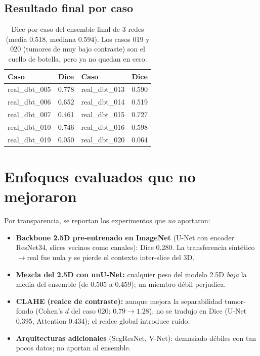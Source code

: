 \documentclass[11pt]{article}
\begin{document}
\subsection{Resultado final por caso}
\begin{table}[H]\centering
\begin{tabular}{lc|lc}
\toprule
Caso & Dice & Caso & Dice \\
\midrule
real\_dbt\_005 & 0.778 & real\_dbt\_013 & 0.590 \\
real\_dbt\_006 & 0.652 & real\_dbt\_014 & 0.519 \\
real\_dbt\_007 & 0.461 & real\_dbt\_015 & 0.727 \\
real\_dbt\_010 & 0.746 & real\_dbt\_016 & 0.598 \\
real\_dbt\_019 & 0.050 & real\_dbt\_020 & 0.064 \\
\bottomrule
\end{tabular}
\caption{Dice por caso del ensemble final de 3 redes (media 0.518, mediana 0.594).
Los casos 019 y 020 (tumores de muy bajo contraste) son el cuello de botella, pero
ya no quedan en cero.}
\end{table}

\section{Enfoques evaluados que no mejoraron}
Por transparencia, se reportan los experimentos que \emph{no} aportaron:
\begin{itemize}\itemsep2pt
  \item \textbf{Backbone 2.5D pre-entrenado en ImageNet} (U-Net con encoder ResNet34,
        slices vecinos como canales): Dice 0.280. La transferencia sintético$\rightarrow$real
        fue nula y se pierde el contexto inter-slice del 3D.
  \item \textbf{Mezcla del 2.5D con nnU-Net:} cualquier peso del modelo 2.5D \emph{baja}
        la media del ensemble (de 0.505 a 0.459); un miembro débil perjudica.
  \item \textbf{CLAHE (realce de contraste):} aunque mejora la separabilidad
        tumor-fondo (Cohen's $d$ del caso 020: $0.79\rightarrow1.28$), no se tradujo en
        Dice (U-Net 0.395, Attention 0.434); el realce global introduce ruido.
  \item \textbf{Arquitecturas adicionales} (SegResNet, V-Net): demasiado débiles con
        tan pocos datos; no aportan al ensemble.
\end{itemize}
\end{document}

